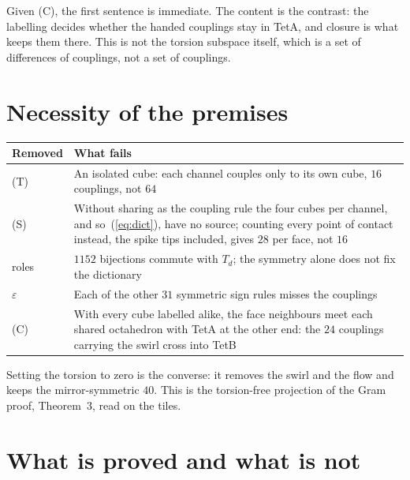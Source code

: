 \documentclass[twocolumn]{iopjournal}
\begin{document}
\medskip\noindent
Given (C), the first sentence is immediate. The content is the
contrast: the labelling decides whether the handed couplings stay in
TetA, and closure is what keeps them there. This is not the torsion
subspace itself, which is a set of differences of couplings, not a
set of couplings.


\section*{Necessity of the premises}

\vspace{4pt}
\noindent
{\footnotesize
\begin{tabular*}{\columnwidth}{@{\extracolsep{\fill}}l>{\raggedright\arraybackslash}p{}@{}}
\hline
Removed & What fails \\
\hline
(T) & An isolated cube: each channel couples only to its own cube, $16$ couplings, not $64$ \\
(S) & Without sharing as the coupling rule the four cubes per channel, and so~(\ref{eq:dict}), have no source; counting every point of contact instead, the spike tips included, gives $28$ per face, not $16$ \\
roles & $1152$ bijections commute with $T_d$; the symmetry alone does not fix the dictionary \\
$\varepsilon$ & Each of the other $31$ symmetric sign rules misses the couplings \\
(C) & With every cube labelled alike, the face neighbours meet each shared octahedron with TetA at the other end: the $24$ couplings carrying the swirl cross into TetB \\
\hline
\end{tabular*}}
\vspace{4pt}

\noindent
Setting the torsion to zero is the converse: it removes the swirl and
the flow and keeps the mirror-symmetric $40$. This is the
torsion-free projection of the Gram proof, Theorem~3, read on the
tiles.


\section*{What is proved and what is not}
\end{document}
